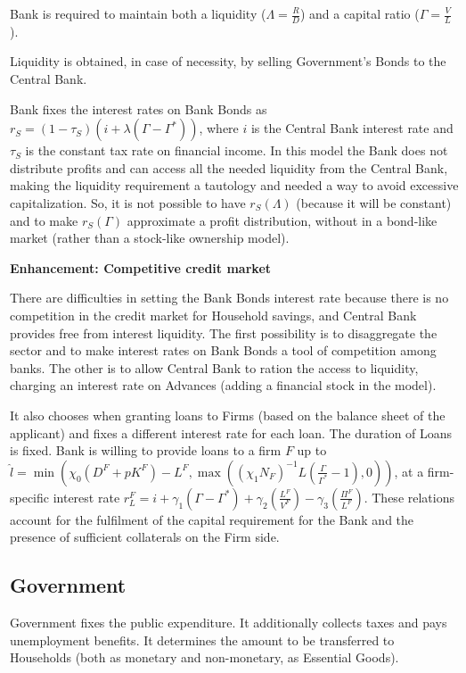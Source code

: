\documentclass[a4paper, headings=standardclasses]{scrartcl}
\newenvironment{enh}[1][]{\begin{framed}\noindent\textbf{Enhancement: #1}\par}{\end{framed}}
\begin{document}
Bank is required to maintain both a liquidity ($\Lambda = \frac{R}{D}$) and a capital ratio ($\Gamma = \frac{V}{L}$).

Liquidity is obtained, in case of necessity, by selling Government's Bonds to the Central Bank.

Bank fixes the interest rates on Bank Bonds as $r_S = (1 - \tau_S) (i + \lambda(\Gamma - \Gamma^*))$, where $i$ is the Central Bank interest rate and $\tau_S$ is the constant tax rate on financial income. In this model the Bank does not distribute profits and can access all the needed liquidity from the Central Bank, making the liquidity requirement a tautology and needed a way to avoid excessive capitalization. So, it is not possible to have $r_S(\Lambda)$ (because it will be constant) and to make $r_S(\Gamma)$ approximate a profit distribution, without in a bond-like market (rather than a stock-like ownership model).

\begin{enh}[Competitive credit market]
	There are difficulties in setting the Bank Bonds interest rate because there is no competition in the credit market for Household savings, and Central Bank provides free from interest liquidity.
	The first possibility is to disaggregate the sector and to make interest rates on Bank Bonds a tool of competition among banks.
	The other is to allow Central Bank to ration the access to liquidity, charging an interest rate on Advances (adding a financial stock in the model).
\end{enh}

It also chooses when granting loans to Firms (based on the balance sheet of the applicant) and fixes a different interest rate for each loan. The duration of Loans is fixed.
Bank is willing to provide loans to a firm $F$ up to $\hat{l} = \min (\chi_0 (D^F+pK^F) - L^F, \max((\chi_1 N_F)^{-1} L (\frac{\Gamma}{\Gamma^*}-1),0))$, at a firm-specific interest rate $r_L^F = i + \gamma_1 (\Gamma - \Gamma^*) + \gamma_2 (\frac{L^F}{V^F}) - \gamma_3 (\frac{\Pi^F}{L^F})$.
These relations account for the fulfilment of the capital requirement for the Bank and the presence of sufficient collaterals on the Firm side.

\subsection{Government}
Government fixes the public expenditure. It additionally collects taxes and pays unemployment benefits. It determines the amount to be transferred to Households (both as monetary and non-monetary, as Essential Goods).
\end{document}
